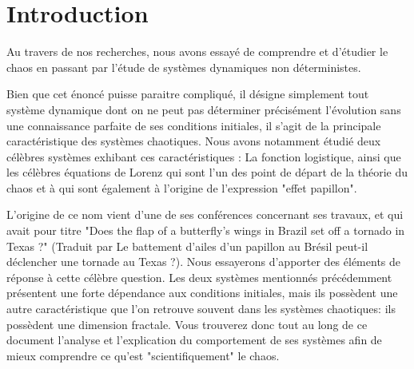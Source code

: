 \chapter{Introduction}
Au travers de nos recherches, nous avons essayé de comprendre et d'étudier le chaos en passant par l'étude de systèmes dynamiques non déterministes. 

Bien que cet énoncé puisse paraitre compliqué, il désigne simplement tout système dynamique dont on ne peut pas déterminer précisément l'évolution sans une connaissance parfaite de ses conditions initiales, il s'agit de la principale caractéristique des systèmes chaotiques. Nous avons notamment étudié deux célèbres systèmes exhibant ces caractéristiques : La fonction logistique, ainsi que les célèbres équations de Lorenz qui sont l'un des \og point de départ \fg{} de la théorie du chaos et à qui sont également à l'origine de l'expression "effet papillon".

L'origine de ce nom vient d'une de ses conférences concernant ses travaux, et qui avait pour titre "Does the flap of a butterfly’s wings in Brazil set off a tornado in Texas ?" (Traduit par \og Le battement d'ailes d'un papillon au Brésil peut-il déclencher une tornade au Texas ?\fg{}). Nous essayerons d’apporter des éléments de réponse à cette célèbre question. Les deux systèmes mentionnés précédemment présentent une forte dépendance aux conditions initiales, mais ils possèdent une autre caractéristique que l'on retrouve souvent dans les systèmes chaotiques: ils possèdent une dimension fractale. Vous trouverez donc tout au long de ce document l'analyse et l'explication du comportement de ses systèmes afin de mieux comprendre ce qu'est "scientifiquement" le chaos.
  

